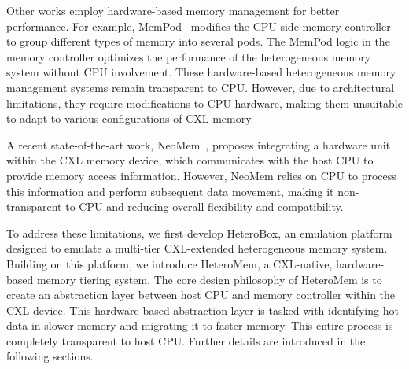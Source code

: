 Other works employ hardware-based memory management for better performance. For example, MemPod~\cite{mempod_hpca17} modifies the CPU-side memory controller to group different types of memory into several pods. The MemPod logic in the memory controller optimizes the performance of the heterogeneous memory system without CPU involvement. These hardware-based heterogeneous memory management systems remain transparent to CPU. However, due to architectural limitations, they require modifications to CPU hardware, making them unsuitable to adapt to various configurations of CXL memory.

A recent state-of-the-art work, NeoMem~\cite{neomem}, proposes integrating a hardware unit within the CXL memory device, which communicates with the host CPU to provide memory access information. However, NeoMem relies on CPU to process this information and perform subsequent data movement, making it non-transparent to CPU and reducing overall flexibility and compatibility.


\vspace{5pt}
\noindent{}
\vspace{5pt}



To address these limitations, we first develop HeteroBox, an emulation platform designed to emulate a multi-tier CXL-extended heterogeneous memory system. Building on this platform, we introduce HeteroMem, a CXL-native, hardware-based memory tiering system. The core design philosophy of HeteroMem is to create an abstraction layer between host CPU and memory controller within the CXL device. This hardware-based abstraction layer is tasked with identifying hot data in slower memory and migrating it to faster memory. This entire process is completely transparent to host CPU. Further details are introduced in the following sections.


